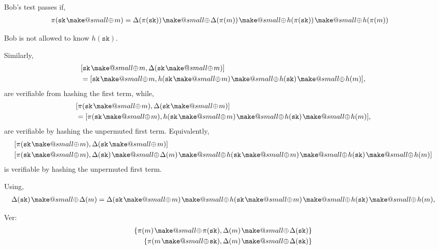 \documentclass[twocolumn, aps, amsmath, amssymb, nofootinbib, superscriptaddress, longbibliography, doublefloatfix, table-of-contents, eqsecnum, rmp]{revtex4-2}
\makeatletter
\newcommand{\soplus}{{{\hspace{1pt}}{\mathbin{\mathpalette\make@small{\mathbin\oplus}}}}{\hspace{1pt}}}
\newcommand{\make@small}[2]{%
  \vcenter{\hbox{%
    \scalebox{0.6}{$\m@th#1#2$}%
  }}%
}
\makeatother
\begin{document}
Bob's test passes if,
\begin{align}
	\pi(\mathtt{sk} \soplus m) &= \Delta(\pi(\mathtt{sk})) \soplus \Delta(\pi(m)) \soplus h(\pi(\mathtt{sk})) \soplus h(\pi(m))
\end{align}

Bob is not allowed to know $h(\mathtt{sk})$.

Similarly,
\begin{align}
	&[\mathtt{sk} \soplus m, \Delta(\mathtt{sk}\soplus m)] \nonumber\\
	&= [\mathtt{sk} \soplus m, h(\mathtt{sk}\soplus m) \soplus h(\mathtt{sk}) \soplus h(m)],
\end{align}
are verifiable from hashing the first term, while,
\begin{align}
	&[\pi(\mathtt{sk} \soplus m), \Delta(\mathtt{sk}\soplus m)] \nonumber\\
	&= [\pi(\mathtt{sk} \soplus m), h(\mathtt{sk}\soplus m) \soplus h(\mathtt{sk}) \soplus h(m)],
\end{align}
are verifiable by hashing the unpermuted first term. Equivalently,
\begin{align}
	&[\pi(\mathtt{sk} \soplus m), \Delta(\mathtt{sk}\soplus m)] \nonumber\\
	&[\pi(\mathtt{sk} \soplus m), \Delta(\mathtt{sk})\soplus \Delta(m) \soplus h(\mathtt{sk}\soplus m) \soplus h(\mathtt{sk}) \soplus h(m)] \nonumber\\\end{align}
is verifiable by hashing the unpermuted first term.

Using,
\begin{align}
	\Delta(\mathtt{sk}) \soplus \Delta(m) &= \Delta(\mathtt{sk} \soplus m) \soplus h(\mathtt{sk} \soplus m)	\soplus h(\mathtt{sk}) \soplus h(m),\nonumber\\
\end{align}


Ver:
\begin{align}
	\{\pi(m)\soplus \pi(\mathtt{sk}), \Delta(m)\soplus \Delta(\mathtt{sk})\} \nonumber\\
	\{\pi(m\soplus \mathtt{sk}), \Delta(m)\soplus \Delta(\mathtt{sk})\}
\end{align}
\end{document}
